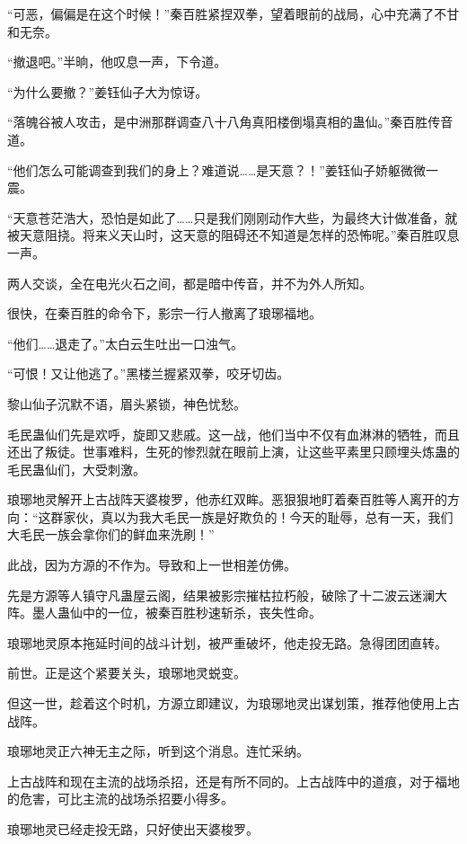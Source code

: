 
\begin{this_body}

“可恶，偏偏是在这个时候！”秦百胜紧捏双拳，望着眼前的战局，心中充满了不甘和无奈。

“撤退吧。”半晌，他叹息一声，下令道。

“为什么要撤？”姜钰仙子大为惊讶。

“落魄谷被人攻击，是中洲那群调查八十八角真阳楼倒塌真相的蛊仙。”秦百胜传音道。

“他们怎么可能调查到我们的身上？难道说……是天意？！”姜钰仙子娇躯微微一震。

“天意苍茫浩大，恐怕是如此了……只是我们刚刚动作大些，为最终大计做准备，就被天意阻挠。将来义天山时，这天意的阻碍还不知道是怎样的恐怖呢。”秦百胜叹息一声。

两人交谈，全在电光火石之间，都是暗中传音，并不为外人所知。

很快，在秦百胜的命令下，影宗一行人撤离了琅琊福地。

“他们……退走了。”太白云生吐出一口浊气。

“可恨！又让他逃了。”黑楼兰握紧双拳，咬牙切齿。

黎山仙子沉默不语，眉头紧锁，神色忧愁。

毛民蛊仙们先是欢呼，旋即又悲戚。这一战，他们当中不仅有血淋淋的牺牲，而且还出了叛徒。世事难料，生死的惨烈就在眼前上演，让这些平素里只顾埋头炼蛊的毛民蛊仙们，大受刺激。

琅琊地灵解开上古战阵天婆梭罗，他赤红双眸。恶狠狠地盯着秦百胜等人离开的方向：“这群家伙，真以为我大毛民一族是好欺负的！今天的耻辱，总有一天，我们大毛民一族会拿你们的鲜血来洗刷！”

此战，因为方源的不作为。导致和上一世相差仿佛。

先是方源等人镇守凡蛊屋云阁，结果被影宗摧枯拉朽般，破除了十二波云迷澜大阵。墨人蛊仙中的一位，被秦百胜秒速斩杀，丧失性命。

琅琊地灵原本拖延时间的战斗计划，被严重破坏，他走投无路。急得团团直转。

前世。正是这个紧要关头，琅琊地灵蜕变。

但这一世，趁着这个时机，方源立即建议，为琅琊地灵出谋划策，推荐他使用上古战阵。

琅琊地灵正六神无主之际，听到这个消息。连忙采纳。

上古战阵和现在主流的战场杀招，还是有所不同的。上古战阵中的道痕，对于福地的危害，可比主流的战场杀招要小得多。

琅琊地灵已经走投无路，只好使出天婆梭罗。


\end{this_body}
